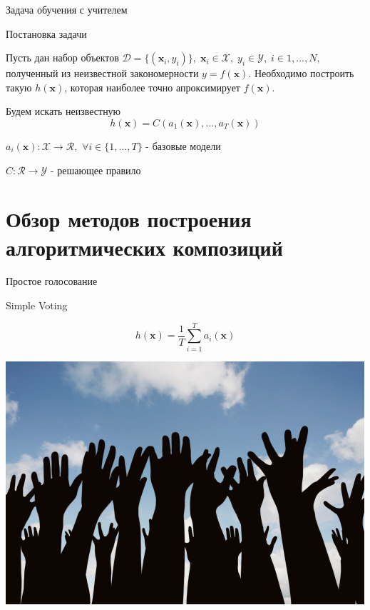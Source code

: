\documentclass[10pt]{beamer}
\begin{document}
\begin{frame}{Задача обучения с учителем}
\begin{block}{Постановка задачи}
\end{block}

Пусть дан набор объектов $\mathcal{D} = \{(\mathbf{x}_i, y_i)\},
\; \mathbf{x}_i \in \mathcal{X},
\; y_i \in \mathcal{Y},
\; i \in 1, \ldots, N$, полученный из неизвестной закономерности $y =
f(\mathbf{x})$. Необходимо построить такую $h(\mathbf{x})$, которая наиболее точно
апроксимирует $f(\mathbf{x})$.

\vspace{1em}
Будем искать неизвестную 
\[
    h(\mathbf{x}) = C(a_1(\mathbf{x}), \ldots, a_T(\mathbf{x}))
\]

$a_i(\mathbf{x}):\mathcal{X} \rightarrow \mathcal{R}, \,\, \forall i \in
\{1,\ldots, T\}$ - базовые модели 

$C: \mathcal{R} \rightarrow \mathcal{Y}$ - решающее правило
\end{frame}

\section{Обзор методов построения алгоритмических композиций}

\begin{frame}{Простое голосование}
\begin{block}{Simple Voting}
\end{block}
\[
    h(\mathbf{x}) = \frac{1}{T} \sum \limits_{i=1}^{T} a_i(\mathbf{x})
\]
\begin{center}
    \includegraphics[scale=0.3]{images/voting.jpg}
\end{center}

\end{frame}
\end{document}
